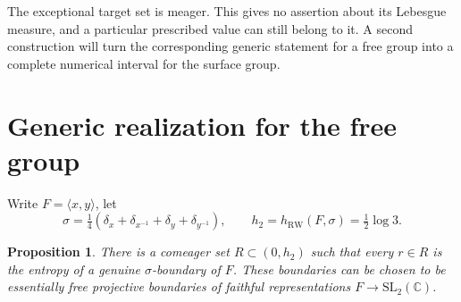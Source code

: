 \documentclass[11pt,letterpaper]{amsart}
\newtheorem{proposition}[theorem]{Proposition}
\theoremstyle{definition}
\theoremstyle{remark}
\numberwithin{equation}{section}
\begin{document}
The exceptional target set is meager. This gives no assertion about its
Lebesgue measure, and a particular prescribed value can still
belong to it. A second construction will turn the corresponding
generic statement for a free group into a complete numerical interval
for the surface group.

\section{Generic realization for the free group}\label{sec:free-generic}

Write $F=\langle x,y\rangle$, let
\[
 \sigma=\tfrac14(\delta_x+\delta_{x^{-1}}+\delta_y+\delta_{y^{-1}}),
 \qquad h_2=h_{\mathrm{RW}}(F,\sigma)=\tfrac12\log3.
\]

\begin{proposition}\label{prop:free-generic}
There is a comeager set $R\subset(0,h_2)$ such that every $r\in R$
is the entropy of a genuine $\sigma$-boundary of $F$.  These boundaries
can be chosen to be essentially free projective boundaries of faithful
representations $F\longrightarrow\mathrm{SL}_2(\mathbb C)$.
\end{proposition}
\end{document}
